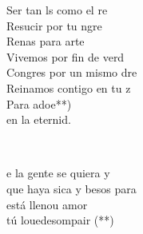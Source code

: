 \documentclass[12pt]{article}
\begin{document}
\begin{multicols*}{2}
\begin{cancion}
\begin{chorus}
	Ser tan ls como el re\\
	Resucir por tu ngre\\
	Renas para arte\\
	Vivemos por fin de verd\\
	Congres por un mismo dre\\
	Reinamos contigo en tu z\\
	Para adoe**)\\
	en la eternid.\\
	\end{chorus}%
	\jump\\
\end{cancion}%

\begin{cancion}%
	e la gente se quiera y\\
	que haya sica y besos para  \\
	 está llenou amor\\
	tú louedesompair (**)\\
\end{cancion}%


\end{multicols*}
\end{document}
